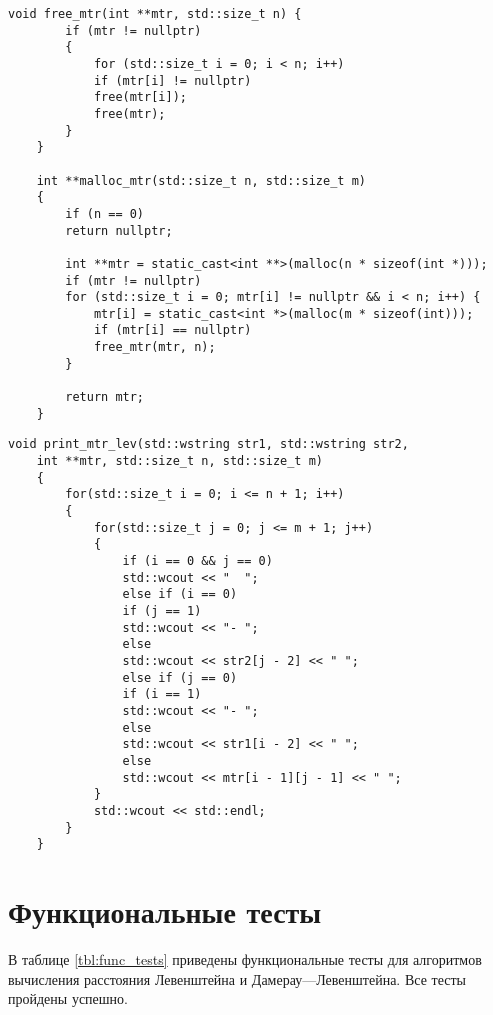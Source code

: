 \begin{lstlisting}[label=lst:allocate_mtr,caption=Функции динамического выделения и очищения памяти под матрицу]
	void free_mtr(int **mtr, std::size_t n) {
		if (mtr != nullptr)
		{
			for (std::size_t i = 0; i < n; i++)
			if (mtr[i] != nullptr)
			free(mtr[i]);
			free(mtr);
		}
	}
	
	int **malloc_mtr(std::size_t n, std::size_t m)
	{
		if (n == 0)
		return nullptr;
		
		int **mtr = static_cast<int **>(malloc(n * sizeof(int *)));
		if (mtr != nullptr)
		for (std::size_t i = 0; mtr[i] != nullptr && i < n; i++) {
			mtr[i] = static_cast<int *>(malloc(m * sizeof(int)));
			if (mtr[i] == nullptr)
			free_mtr(mtr, n);
		}
		
		return mtr;
	}
\end{lstlisting}

\clearpage

\begin{lstlisting}[label=lst:print_mtr,caption=Функции вывода матрицы для алгоритмов поиска расстояния Левенштейна и Дамерау-Левенштейна]
	void print_mtr_lev(std::wstring str1, std::wstring str2,
	int **mtr, std::size_t n, std::size_t m)
	{
		for(std::size_t i = 0; i <= n + 1; i++)
		{
			for(std::size_t j = 0; j <= m + 1; j++)
			{
				if (i == 0 && j == 0)
				std::wcout << "  ";
				else if (i == 0)
				if (j == 1)
				std::wcout << "- ";
				else
				std::wcout << str2[j - 2] << " ";
				else if (j == 0)
				if (i == 1)
				std::wcout << "- ";
				else
				std::wcout << str1[i - 2] << " ";
				else
				std::wcout << mtr[i - 1][j - 1] << " ";
			}
			std::wcout << std::endl;
		}
	}
\end{lstlisting}

\clearpage

\section{Функциональные тесты}

В таблице \ref{tbl:func_tests} приведены функциональные тесты для алгоритмов вычисления расстояния Левенштейна и Дамерау—Левенштейна. Все тесты пройдены успешно.


